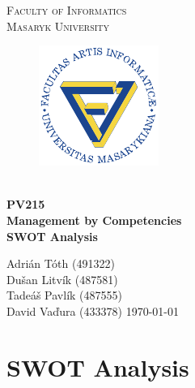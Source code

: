\documentclass[11pt,a4paper]{article}
\begin{document}
\begin{titlepage}
    \begin{center}
        \Huge{
            \textsc{
                Faculty of Informatics\\
                \hspace{25px}Masaryk University
            }
        }
        \vspace{50px}
        \begin{figure}[!h]
            \centering
            \includegraphics[scale=3]{muni-fi-logo.pdf}
        \end{figure}
        \\[15mm]
        \Huge{
            \textbf{
                PV215
            }
        }
        \\[1.5mm]
        \huge{
            \textbf{
                Management by Competencies
            }
        }
        \\[2.5em]
        \LARGE{
            \textbf{
                SWOT Analysis
            }
        }
        \vfill
    \end{center}
        \Large{
            Adrián Tóth (491322)\\
            Dušan Litvík (487581)\\
            Tadeáš Pavlík (487555)\\
            David Vaďura (433378) \hfill \today
        }

\end{titlepage}

\section*{SWOT Analysis}
\end{document}
